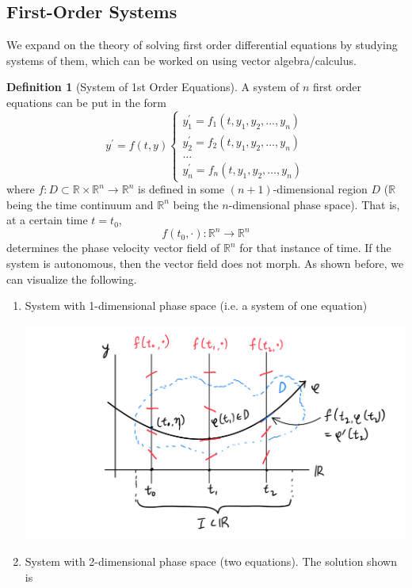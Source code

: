 \documentclass{article}
\theoremstyle{remark}
\theoremstyle{definition}
\newtheorem{definition}{Definition}[section]
\begin{document}
\subsection{First-Order Systems}
We expand on the theory of solving first order differential equations by studying systems of them, which can be worked on using vector algebra/calculus. 

\begin{definition}[System of 1st Order Equations]
A system of $n$ first order equations can be put in the form 
\[y^\prime = f(t, y) \begin{cases}
y_1^\prime  = f_1 (t, y_1, y_2, \ldots, y_n) \\
y_2^\prime  = f_2 (t, y_1, y_2, \ldots, y_n) \\
\ldots \\
y_n^\prime  = f_n (t, y_1, y_2, \ldots, y_n) 
\end{cases}\]
where $f: D \subset \mathbb{R} \times \mathbb{R}^n \longrightarrow \mathbb{R}^n$ is defined in some $(n+1)$-dimensional region $D$ ($\mathbb{R}$ being the time continuum and $\mathbb{R}^n$ being the $n$-dimensional phase space). That is, at a certain time $t = t_0$, 
\[f(t_0, \cdot): \mathbb{R}^n \longrightarrow \mathbb{R}^n\]
determines the phase velocity vector field of $\mathbb{R}^n$ for that instance of time. If the system is autonomous, then the vector field does not morph. As shown before, we can visualize the following. 
\begin{enumerate}
    \item System with 1-dimensional phase space (i.e. a system of one equation) 
    \begin{center}
        \includegraphics[scale=0.26]{img/System_w_1_dim_Phase_Space.PNG}
    \end{center}
    \item System with 2-dimensional phase space (two equations). The solution shown is 

\end{enumerate}
\end{definition}
\end{document}
